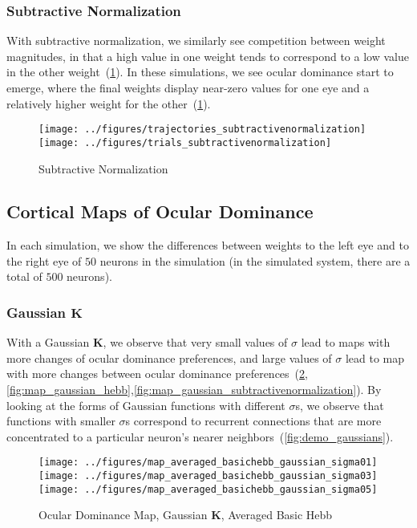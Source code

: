 \documentclass[pageno]{mat323paper}
\begin{document}
\subsubsection{Subtractive Normalization}
With subtractive normalization, we similarly see competition between weight magnitudes, in that a high value in one weight tends to correspond to a low value in the other weight~(\ref{fig:subtractivenormalization}). In these simulations, we see ocular dominance start to emerge, where the final weights display near-zero values for one eye and a relatively higher weight for the other~(\ref{fig:subtractivenormalization}).

\begin{figure}[h]
\texttt{[image: ../figures/trajectories\_subtractivenormalization]}
\texttt{[image: ../figures/trials\_subtractivenormalization]}
\caption{Subtractive Normalization}
\label{fig:subtractivenormalization}
\end{figure}

\subsection{Cortical Maps of Ocular Dominance}
In each simulation, we show the differences between weights to the left eye and to the right eye of $50$ neurons in the simulation (in the simulated system, there are a total of $500$ neurons).

\subsubsection{Gaussian $\mathbf{K}$}
With a Gaussian $\mathbf{K}$, we observe that very small values of $\sigma$ lead to maps with more changes of ocular dominance preferences, and large values of $\sigma$ lead to map with more changes between ocular dominance preferences~(\ref{fig:map_gaussian_averagedhebb},\ref{fig:map_gaussian_hebb},\ref{fig:map_gaussian_subtractivenormalization}). By looking at the forms of Gaussian functions with different $\sigma$s, we observe that functions with smaller $\sigma$s correspond to recurrent connections that are more concentrated to a particular neuron's nearer neighbors~(\ref{fig:demo_gaussians}).

\begin{figure}[h]
\texttt{[image: ../figures/map\_averaged\_basichebb\_gaussian\_sigma01]}
\texttt{[image: ../figures/map\_averaged\_basichebb\_gaussian\_sigma03]}
\texttt{[image: ../figures/map\_averaged\_basichebb\_gaussian\_sigma05]}
\caption{Ocular Dominance Map, Gaussian $\mathbf{K}$, Averaged Basic Hebb}
\label{fig:map_gaussian_averagedhebb}
\end{figure}
\end{document}
